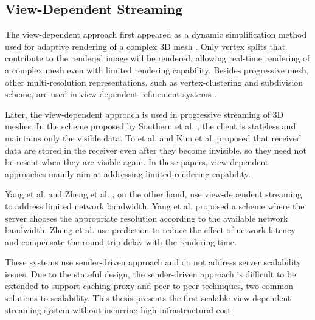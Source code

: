 \documentclass[11pt, a4paper]{report}
\begin{document}
    \subsection{View-Dependent Streaming}
    The view-dependent approach first appeared as 
    a dynamic simplification method used for adaptive rendering of a complex 3D mesh
    \cite{258843, 258847}. Only vertex splits that contribute to the rendered
    image will be rendered, allowing real-time rendering of a complex mesh
    even with limited rendering capability.
    Besides progressive mesh, other multi-resolution representations, 
    such as vertex-clustering  and subdivision scheme,
    are used in view-dependent refinement systems \cite{245627, efficient:Alliez,602344}.

    Later, the view-dependent approach is used in progressive 
	streaming of 3D meshes.     
    In the scheme proposed by Southern et al. \cite{363375},  the client is stateless and
    maintains only the visible data. 
    To et al. \cite{To1999}
    and Kim et al. \cite{kim:view} proposed that received data are stored
    in the receiver even after they become invisible, 
    so they need not be resent when they are visible again. 
    In these papers, view-dependent approaches mainly aim at addressing
    limited rendering capability. 
    
    Yang et al. \cite{progressive:Yang} and
    Zheng et al. \cite{zheng:interactive}, on the other hand, use
    view-dependent streaming to address limited network bandwidth.
    Yang et al. proposed a scheme where the server chooses the appropriate resolution
    according to the available network bandwidth.
    Zheng et al. \cite{zheng:interactive} use prediction to
    reduce the effect of network latency and 
    compensate the round-trip delay with the rendering time.
     
    These systems use sender-driven approach and do not address
    server scalability issues. Due to the stateful design, 
    the sender-driven approach is difficult to be extended to
    support caching proxy and peer-to-peer techniques, two 
    common solutions to scalability. This thesis presents the first
    scalable 
    view-dependent streaming system without incurring high infrastructural cost.

    
\end{document}
